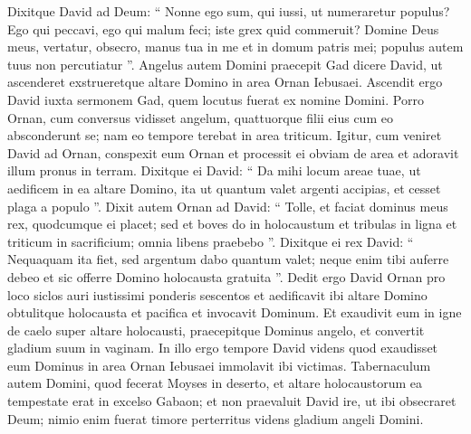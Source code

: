 \begin{biblechapter}
\begin{biblechapter}
\begin{biblechapter}
\begin{biblechapter}
\begin{biblechapter}
\begin{biblechapter}
\begin{biblechapter}
\begin{biblechapter}
\begin{biblechapter}
\begin{biblechapter}
\begin{biblechapter}
\begin{biblechapter}
\begin{biblechapter}
\begin{biblechapter}
\begin{biblechapter}
\begin{biblechapter}
\begin{biblechapter}
\begin{biblechapter}
\begin{biblechapter}
\begin{biblechapter}
\begin{biblechapter}
\verse Dixitque David ad Deum: “ Nonne ego sum, qui iussi, ut numeraretur populus? Ego qui peccavi, ego qui malum feci; iste grex quid commeruit? Domine Deus meus, vertatur, obsecro, manus tua in me et in domum patris mei; populus autem tuus non percutiatur ”. 
\verse Angelus autem Domini praecepit Gad dicere David, ut ascenderet exstrueretque altare Domino in area Ornan Iebusaei. 
\verse Ascendit ergo David iuxta sermonem Gad, quem locutus fuerat ex nomine Domini. 
\verse Porro Ornan, cum conversus vidisset angelum, quattuorque filii eius cum eo absconderunt se; nam eo tempore terebat in area triticum. 
\verse Igitur, cum veniret David ad Ornan, conspexit eum Ornan et processit ei obviam de area et adoravit illum pronus in terram. 
 \verse Dixitque ei David: “ Da mihi locum areae tuae, ut aedificem in ea altare Domino, ita ut quantum valet argenti accipias, et cesset plaga a populo ”. 
 \verse Dixit autem Ornan ad David: “ Tolle, et faciat dominus meus rex, quodcumque ei placet; sed et boves do in holocaustum et tribulas in ligna et triticum in sacrificium; omnia libens praebebo ”. 
\verse Dixitque ei rex David: “ Nequaquam ita fiet, sed argentum dabo quantum valet; neque enim tibi auferre debeo et sic offerre Domino holocausta gratuita ”.
 \verse Dedit ergo David Ornan pro loco siclos auri iustissimi ponderis sescentos 
 \verse et aedificavit ibi altare Domino obtulitque holocausta et pacifica et invocavit Dominum. Et exaudivit eum in igne de caelo super altare holocausti, 
 \verse praecepitque Dominus angelo, et convertit gladium suum in vaginam.
 \verse In illo ergo tempore David videns quod exaudisset eum Dominus in area Ornan Iebusaei immolavit ibi victimas. 
\verse Tabernaculum autem Domini, quod fecerat Moyses in deserto, et altare holocaustorum ea tempestate erat in excelso Gabaon; 
\verse et non praevaluit David ire, ut ibi obsecraret Deum; nimio enim fuerat timore perterritus videns gladium angeli Domini.
 

\end{biblechapter}
\end{biblechapter}
\end{biblechapter}
\end{biblechapter}
\end{biblechapter}
\end{biblechapter}
\end{biblechapter}
\end{biblechapter}
\end{biblechapter}
\end{biblechapter}
\end{biblechapter}
\end{biblechapter}
\end{biblechapter}
\end{biblechapter}
\end{biblechapter}
\end{biblechapter}
\end{biblechapter}
\end{biblechapter}
\end{biblechapter}
\end{biblechapter}
\end{biblechapter}

